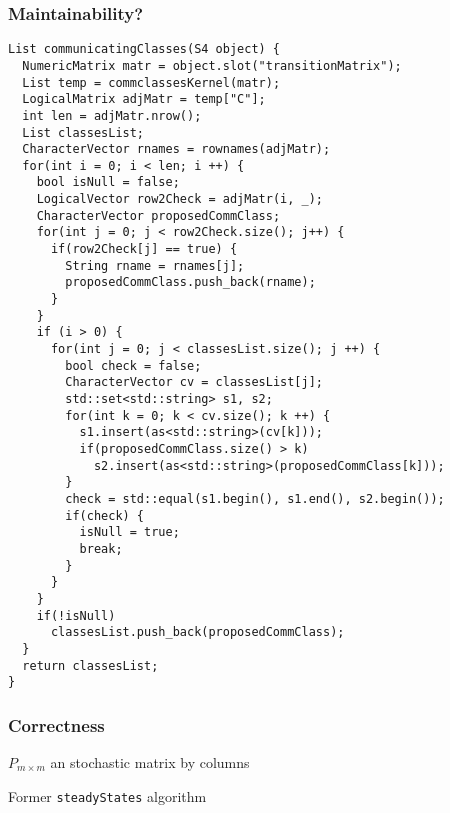 \begin{frame}[fragile] \frametitle{Maintainability?}
\vspace{2.7em}
\begin{verbatim}
List communicatingClasses(S4 object) {
  NumericMatrix matr = object.slot("transitionMatrix");
  List temp = commclassesKernel(matr);
  LogicalMatrix adjMatr = temp["C"];
  int len = adjMatr.nrow();
  List classesList;
  CharacterVector rnames = rownames(adjMatr);
  for(int i = 0; i < len; i ++) {
    bool isNull = false;
    LogicalVector row2Check = adjMatr(i, _);
    CharacterVector proposedCommClass;
    for(int j = 0; j < row2Check.size(); j++) {
      if(row2Check[j] == true) {
        String rname = rnames[j];
        proposedCommClass.push_back(rname);
      }
    }
    if (i > 0) {
      for(int j = 0; j < classesList.size(); j ++) {
        bool check = false;        
        CharacterVector cv = classesList[j];
        std::set<std::string> s1, s2;
        for(int k = 0; k < cv.size(); k ++) {
          s1.insert(as<std::string>(cv[k]));
          if(proposedCommClass.size() > k)
            s2.insert(as<std::string>(proposedCommClass[k]));
        }
        check = std::equal(s1.begin(), s1.end(), s2.begin());
        if(check) {
          isNull = true;
          break;
        }
      }
    }
    if(!isNull) 
      classesList.push_back(proposedCommClass);
  }
  return classesList;
}
\end{verbatim}
\end{frame}

\begin{frame}[fragile] \frametitle{Correctness}
\begin{algorithm}[H]
\begin{algorithmic}[1]
  \REQUIRE $P_{m \times m}$ an stochastic matrix by columns
  \ENDFOR
  \NEWLINE
\end{algorithmic}
\caption{Former \texttt{steadyStates} algorithm}
\label{alg:computeSteadyStatesFirst}
\end{algorithm}

\end{frame}

